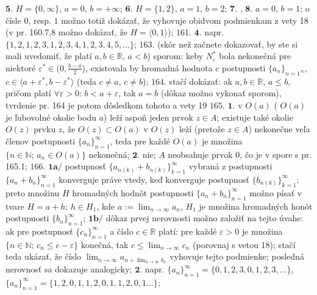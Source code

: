 $\boldsymbol{5.}$   $ H= \lbrace 0,\infty \rbrace $, $a=0, \, b=+\infty $;
$\boldsymbol{6.}$   $ H= \lbrace 1,2\rbrace $, $a=1, \, b=2 $;
 $\boldsymbol{7.}$ , $\boldsymbol{8.}$ $a=0,\, b=1$; o čísle $0$, resp. $1$ možno totiž dokázať, že vyhovuje obidvom podmienkam z vety 18 (v pr. 160.7,8 možno dokázať, že $ H= \langle0,1\rangle $);
$\boxed{161.}$ $\boldsymbol{4.}$  napr. $\lbrace 1,2,1,2,3,1,2,3,4,1,2,3,4,5,... \rbrace $;
$\boxed{163.}$ (skôr než začnete dokazovať, by ste si mali uvedomiť, že platí  $a,b \in \mathbb{R}, \, a<b$) sporom: keby $N_{\varepsilon}^{*} $ bola nekonečná pre niektoré $\varepsilon^{*} \in (0, \frac{b-a}{2} $), existovala by hromadná hodnota $c$ postupnosti $\lbrace a _{n} \rbrace_{n=1^{\infty}}  $, $c \in \langle a+\varepsilon^{*},b-\varepsilon^{*} \rangle $ (teda $c\ne a, \, c\ne b $);
$\boxed{164.}$ stačí dokázať: ak $a,b \in \mathbb{R}, \, a\leq b $, pričom platí $\forall \varepsilon >0: \, b< a+\varepsilon $, tak   $a=b $ (dôkaz možno vykonať sporom), tvrdenie pr. 164 je potom dôsledkom tohoto a vety 19	
$\boxed{165.}$ $\boldsymbol{1.}$ v $O(a) $ ( $O(a)$ je ľubovolné okolie bodu $a$) leží aspoň jeden prvok $z \in A $; existuje také okolie $O(z) $ prvku $z$, že $O(z) \subset  O(a) $ v $O(z) $ leží (pretože $z \in A $) nekonečne veľa členov postupnosti $\lbrace a_{n}\rbrace_{n=1}^{\infty} $, teda pre každé  $O(a) $ je množina $\lbrace n \in \mathbb{N}; \, a_{n}\in O(a)  \rbrace $ nekonečná;
$\boldsymbol{2.}$ nie; $A$ neobsahuje prvok $0$, čo je v spore s pr. 165.1;
$\boxed{166.}$ $\boldsymbol{1a/}$ postupnosť $\lbrace a _{n(k)}+b_{n(k)} \rbrace_{k=1}^{\infty}  $ vybraná z postupnosti  $\lbrace a _{n} + b_{n} \rbrace_{n=1}^{\infty}$ konverguje práve vtedy, keď konverguje postupnosť $\lbrace b _{n(k)} \rbrace_{k=1}^{\infty}$; preto množinu  $ H $ hromadných hodnôt postupnosti $\lbrace a _{n} + b_{n} \rbrace_{n=1}^{\infty}$ možno písať v tvare $H = a+h;\, h \in H_{1}$, kde  $a:=\lim_{n\rightarrow \infty} a_{n}$, $H_{1}$ je množina hromadných honôt postupnosti  $\lbrace  b_{n} \rbrace_{n=1}^{\infty}$; 
$\boldsymbol{1b/}$ dôkaz prvej nerovnosti možno založiť na tejto úvahe: ak pre postupnosť  $\lbrace  c_{n} \rbrace_{n=1}^{\infty}$ a číslo $c\in \mathbb{R}$ platí: pre každé $\varepsilon > 0 $ je množina  $\lbrace n\in \mathbb{N}; \, c_{n}\leq c- \varepsilon \rbrace$ konečná, tak  $ c \leq \lim_{n\rightarrow \infty} c_{n}$ (porovnaj s vetou 18); stačí teda ukázať, že číslo $ \lim_{n\rightarrow \infty} a_{n + \lim_{n\rightarrow \infty} b_{n}}$ vyhovuje tejto podmienke; posledná nerovnosť sa dokazuje analogicky;
$\boldsymbol{2.}$ napr. $\lbrace a_{n} \rbrace_{n=1}^{\infty} = \lbrace 0,1,2,3,0,1,2,3,...\rbrace $, $\lbrace a_{n} \rbrace_{n=1}^{\infty} = \lbrace 1,2,0,1,1,2,0,1,1,2,0,1...\rbrace $;
